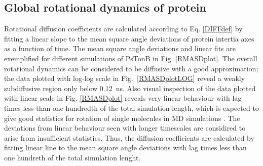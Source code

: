 \documentclass[pre,aps,floatfix,authordate1-4,twocolumn]{revtex4-1}
\begin{document}
\subsection{Global rotational dynamics of protein}
Rotational diffusion coefficients are calculated
according to Eq. \ref{DIFFdef} by fitting a
linear slope to the mean square angle deviations of protein intertia
axes as a function of time. The mean square angle deviations
and linear fits are exemplified for different simulations of PsTonB
in Fig. \ref{RMASDplot}. The overall rotational dynamics can be considered
to be diffusive with a good approximation; the data plotted with
log-log scale in Fig.~\ref{RMASDplotLOG} reveal a weakly subdiffusive region
only below 0.12~ns. Also visual inspection of the data plotted with
linear scale in Fig. \ref{RMASDplot} reveals very linear behaviour
with lag times less than one hundredth of the total simulation length,
which is expected to give good statistics for rotation of single molecules
in MD simulations \cite{??}. The deviations from linear behaviour seen with
longer timescales are considired to arise from insufficient statistics.
Thus, the diffusion coefficients are
calculated by fitting linear line to the mean square angle deviations with
lag times less than one hundreth of the total simulation lenght.
\end{document}
